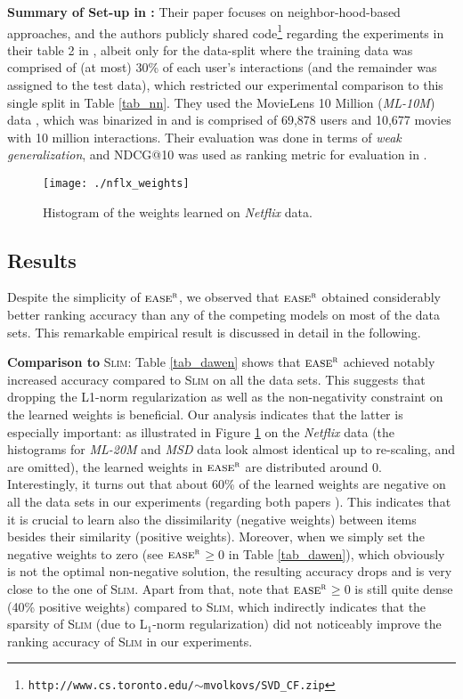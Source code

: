 \documentclass[sigconf]{acmart}
\newcommand{\slim}{{\scshape Slim}}
\newcommand{\sae}{${\textsc{ease}}^{\textsc{r}}$}
\begin{document}
{\bf Summary of Set-up in \cite{volkovs15}:} Their paper focuses on neighbor-hood-based approaches, and
the authors publicly shared code\footnote{{\tt http://www.cs.toronto.edu/$\sim$mvolkovs/SVD\_CF.zip}} regarding the experiments in their table 2 in \cite{volkovs15}, albeit only for the data-split where the training data  was comprised of (at most) 30\% of each user's interactions (and the remainder was assigned to the  test data), which restricted our experimental comparison to this single split in  Table \ref{tab_nn}.
 They used the  MovieLens 10 Million (\emph{ML-10M}) data \cite{movielens20mio}, which was binarized in \cite{volkovs15} and is comprised of 
69,878 users and 
10,677 movies with 10 million interactions.  Their evaluation was done in terms of \emph{weak generalization}, and NDCG@10  was used as ranking metric for evaluation in \cite{volkovs15}. 




\begin{figure}[t]
\begin{center}
\texttt{[image: ./nflx\_weights]}
\end{center}
\caption{Histogram of the weights learned on \emph{Netflix} data.}
\label{fig_weights}
\end{figure}

\subsection{Results}
Despite the    simplicity of \sae{}, we observed that \sae{}  obtained considerably better ranking accuracy than any of the competing models on most of the  data sets. This remarkable empirical result is discussed in detail in the following.
  

{\bf Comparison to} \slim{}:  Table \ref{tab_dawen} shows that \sae{}  achieved notably increased accuracy compared to \slim{} on all the data sets. This suggests that dropping the L1-norm regularization as well as the non-negativity constraint on the learned weights is beneficial. Our analysis indicates that the latter is especially important: as illustrated in Figure \ref{fig_weights} on the \emph{Netflix} data (the histograms for \emph{ML-20M} and \emph{MSD} data look almost identical up to re-scaling, and are omitted), the learned weights in \sae{}  are distributed around 0. Interestingly, it turns out that about 60\% of the learned weights are negative on all the data sets in our experiments (regarding both papers \cite{liang18,volkovs15}). This indicates that it is crucial  to learn also the dissimilarity (negative weights) between items besides their similarity (positive weights).
Moreover, when we simply set the negative weights to zero (see  \sae{}$\ge 0$ in Table \ref{tab_dawen}), which obviously is not the optimal non-negative solution, the resulting accuracy drops and is very close to the one of \slim{}.
Apart from that, note that \sae{}$\ge 0$ is still quite dense (40\% positive weights) compared to \slim{}, which indirectly indicates that the sparsity of \slim{} (due to L$_1$-norm regularization) did not noticeably improve the ranking accuracy of \slim{} in our experiments.
\end{document}
